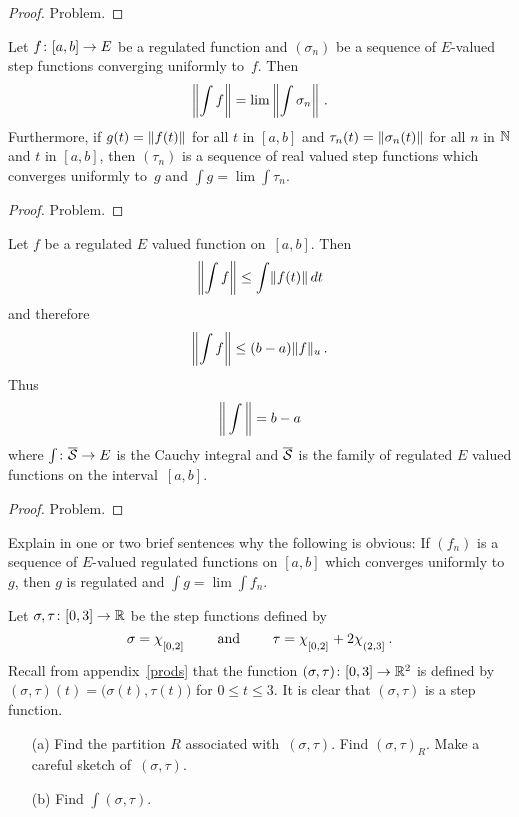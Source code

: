 \begin{proof} Problem.  \ns  \end{proof}

\begin{prop}  Let $f\colon [a,b] \rightarrow E$ be a regulated function and $(\sigma_n)$ be a sequence of
$E$-valued step functions converging uniformly to~$f$.  Then
  \[ \left\lVert\int f\right\rVert = \lim\left\lVert\int\sigma_n\right\rVert\,. \]
Furthermore, if $g(t) = \lVert f(t)\rVert$ for all $t$ in $[a,b]$ and $\tau_n(t) =
\lVert\sigma_n(t)\rVert$ for all $n$ in $\mathbb{N}$ and $t$ in $[a,b]$, then $(\tau_n)$ is a sequence of
real valued step functions which converges uniformly to~$g$ and $\int g = \lim\int\tau_n$.
\end{prop}

\begin{proof} Problem.  \ns  \end{proof}

\begin{prop}\label{prop_norm_Cint} Let $f$ be a regulated $E$ valued function on~$[a,b]$.  Then
  \[ \left\lVert\int f\right\rVert \le \int\lVert f(t)\rVert\,dt \]
and therefore
  \[ \left\lVert\int f\right\rVert \le (b-a)\lVert f\rVert_u\,. \]
Thus
  \[ \left\lVert\,\int\,\right\rVert = b-a \]
where $\int\colon \overline{\mathcal{S}} \rightarrow E$ is the Cauchy integral and $\overline{\mathcal{S}}$ is the family
of regulated $E$ valued functions on the interval~$[a,b]$.
\end{prop}

\begin{proof} Problem.   \ns   \end{proof}

\begin{prob}  Explain in one or two brief sentences why the following is obvious: If $(f_n)$ is
a sequence of $E$-valued regulated functions on $[a,b]$ which converges uniformly to~$g$, then
$g$ is regulated and $\int g = \lim \int f_n$.
\end{prob}

\begin{prob} Let $\sigma, \tau\colon [0,3] \rightarrow \mathbb{R}$ be the step functions defined by
  \[ \sigma = \chi_{{}_{\scriptstyle{[0,2]}}} \qquad \text{ and }
         \qquad  \tau = \chi_{{}_{\scriptstyle{[0,2]}}} + 2\chi_{{}_{\scriptstyle{(2,3]}}}\,. \]
Recall from appendix~\ref{prods} that the function $(\sigma,\tau)\colon [0,3] \rightarrow \mathbb{R}^2$ is
defined by $(\sigma,\tau)(t) = \bigl(\sigma(t),\tau(t)\bigr)$ for $0 \le t \le 3$.  It is
clear that $(\sigma,\tau)$ is a step function.
 \begin{enumerate}
  \item[(a)] Find the partition $R$ associated with~$(\sigma,\tau)$. Find $(\sigma,\tau)_R$.
Make a careful sketch of~$(\sigma,\tau)$.
  \item[(b)] Find $\int(\sigma,\tau)$.
 \end{enumerate}
\end{prob}

